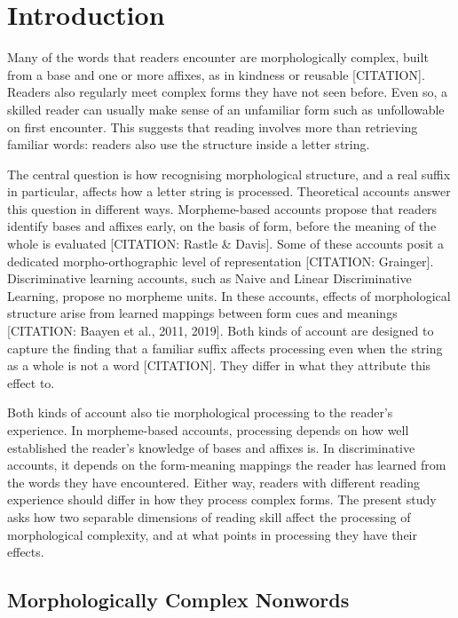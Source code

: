 \documentclass[utf8]{FrontiersinHarvard} %
\begin{document}
	\section{Introduction}

	Many of the words that readers encounter are morphologically complex, built from a base and one or more affixes, as in kindness or reusable [CITATION]. Readers also regularly meet complex forms they have not seen before. Even so, a skilled reader can usually make sense of an unfamiliar form such as unfollowable on first encounter. This suggests that reading involves more than retrieving familiar words: readers also use the structure inside a letter string.

	The central question is how recognising morphological structure, and a real suffix in particular, affects how a letter string is processed. Theoretical accounts answer this question in different ways. Morpheme-based accounts propose that readers identify bases and affixes early, on the basis of form, before the meaning of the whole is evaluated [CITATION: Rastle \& Davis]. Some of these accounts posit a dedicated morpho-orthographic level of representation [CITATION: Grainger]. Discriminative learning accounts, such as Naive and Linear Discriminative Learning, propose no morpheme units. In these accounts, effects of morphological structure arise from learned mappings between form cues and meanings [CITATION: Baayen et al., 2011, 2019]. Both kinds of account are designed to capture the finding that a familiar suffix affects processing even when the string as a whole is not a word [CITATION]. They differ in what they attribute this effect to.

	Both kinds of account also tie morphological processing to the reader’s experience. In morpheme-based accounts, processing depends on how well established the reader’s knowledge of bases and affixes is. In discriminative accounts, it depends on the form-meaning mappings the reader has learned from the words they have encountered. Either way, readers with different reading experience should differ in how they process complex forms. The present study asks how two separable dimensions of reading skill affect the processing of morphological complexity, and at what points in processing they have their effects.


	\subsection{Morphologically Complex Nonwords}
	
\end{document}
